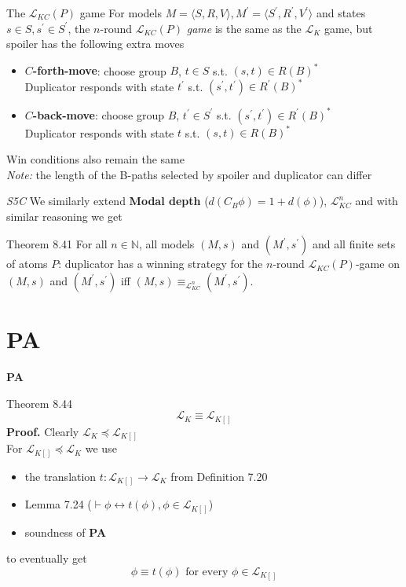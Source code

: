 \documentclass{beamer}
\newcommand{\lang}{\mathcal{L}}
\newcommand{\Spr}{S^\prime}
\newcommand{\spr}{s^\prime}
\newcommand{\tpr}{t^\prime}
\begin{document}
\begin{frame}{The $\lang_{KC}(P)$ game}
	For models $M = \langle S,R,V \rangle, M^\prime = \langle S^\prime,R^\prime,V^\prime \rangle$ and states $s \in S, s^\prime \in S^\prime$, the $n$-round $\lang_{KC}(P)$ \textit{game} is the same as the $\lang_K$ game, but spoiler has the following extra moves \pause
	\begin{itemize}
		\item \textbf{$C$-forth-move}: choose group $B$, $t \in S$ s.t. $(s,t) \in R(B)^*$\\
		Duplicator responds with state $\tpr$ s.t. $(\spr,\tpr) \in R^\prime(B)^*$
		\item \textbf{$C$-back-move}: choose group $B$, $\tpr \in \Spr$ s.t. $(\spr,\tpr) \in R^\prime(B)^*$\\
		Duplicator responds with state $t$ s.t. $(s,t) \in R(B)^*$
	\end{itemize} \pause
	Win conditions also remain the same \pause
	\\[4pt]
	\textit{Note:} the length of the B-paths selected by spoiler and duplicator can differ
\end{frame}

\begin{frame}{\textit{S5C}}
	We similarly extend \textbf{Modal depth} ($d(C_B \phi) = 1 + d(\phi)$), $\lang_{KC}^n$ and with similar reasoning we get \pause
	\begin{block}{Theorem 8.41}
		For all $n \in \mathbb{N}$, all models $(M,s)$ and $(M^\prime,s^\prime)$ and all finite sets of atoms $P$: duplicator has a winning strategy for the $n$-round $\lang_{KC}(P)$-game on $(M,s)$ and $(M^\prime,s^\prime)$ iff $(M,s) \equiv_{\lang_{KC}^n} (M^\prime,s^\prime)$.
	\end{block}
\end{frame}


\section*{\textbf{PA}}

\begin{frame}{\textbf{PA}}
	\begin{block}{Theorem 8.44}
		\[\lang_K \equiv \lang_{K[]}\] \pause
		\textbf{Proof.} Clearly $\lang_K \preceq \lang_{K[]}$\\
		For $\lang_{K[]} \preceq \lang_K$ we use
		\begin{itemize}
			\item the translation $t: \lang_{K[]} \rightarrow \lang_K$ from Definition 7.20
			\item Lemma 7.24 ($\vdash \phi \leftrightarrow t(\phi), \phi \in \lang_{K[]}$)
			\item soundness of \textbf{PA}
		\end{itemize}
	 to eventually get
		\[\phi \equiv t(\phi) \text{ for every } \phi \in \lang_{K[]}\]
	\end{block}
\end{frame}
\end{document}
